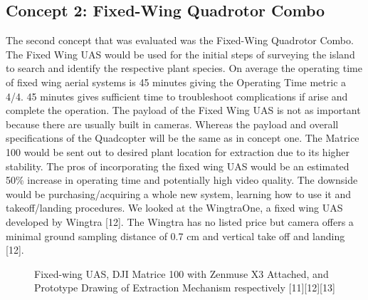 \documentclass{wrcecapstone}
\begin{document}
\subsection{Concept 2:  Fixed-Wing Quadrotor Combo}
The second concept that was evaluated was the Fixed-Wing Quadrotor Combo. The Fixed Wing UAS would be used for the initial steps of surveying the island to search and identify the respective plant species. On average the operating time of fixed wing aerial systems is 45 minutes giving the Operating Time metric a 4/4. 45 minutes gives sufficient time to troubleshoot complications if arise and complete the operation. The payload of the Fixed Wing UAS is not as important because there are usually built in cameras. Whereas the payload and overall specifications of the Quadcopter will be the same as in concept one. The Matrice 100  would be sent out to desired plant location for extraction due to its higher stability. The pros of incorporating the fixed wing UAS would be an estimated 50\% increase in operating time and potentially high video quality. The downside would be purchasing/acquiring a whole new system, learning how to use it and takeoff/landing procedures. We looked at the WingtraOne, a fixed wing UAS developed by Wingtra [12]. The Wingtra has no listed price but camera offers a minimal ground sampling distance of 0.7 cm and vertical take off and landing [12]. 

\begin{figure}
\caption{Fixed-wing UAS, DJI Matrice 100 with Zenmuse X3 Attached, and Prototype Drawing of Extraction Mechanism respectively  [11][12][13]}
\end{figure}
\end{document}
